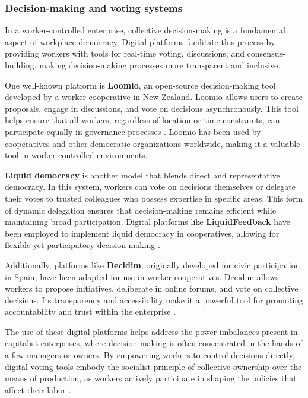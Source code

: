 \begin{refsection}
\subsubsection{Decision-making and voting systems}

In a worker-controlled enterprise, collective decision-making is a fundamental aspect of workplace democracy. Digital platforms facilitate this process by providing workers with tools for real-time voting, discussions, and consensus-building, making decision-making processes more transparent and inclusive.

One well-known platform is \textbf{Loomio}, an open-source decision-making tool developed by a worker cooperative in New Zealand. Loomio allows users to create proposals, engage in discussions, and vote on decisions asynchronously. This tool helps ensure that all workers, regardless of location or time constraints, can participate equally in governance processes \cite[pp.~54-57]{scholz2016}. Loomio has been used by cooperatives and other democratic organizations worldwide, making it a valuable tool in worker-controlled environments.

\textbf{Liquid democracy} is another model that blends direct and representative democracy. In this system, workers can vote on decisions themselves or delegate their votes to trusted colleagues who possess expertise in specific areas. This form of dynamic delegation ensures that decision-making remains efficient while maintaining broad participation. Digital platforms like \textbf{LiquidFeedback} have been employed to implement liquid democracy in cooperatives, allowing for flexible yet participatory decision-making \cite[pp.~109-113]{landemore2022}.

Additionally, platforms like \textbf{Decidim}, originally developed for civic participation in Spain, have been adapted for use in worker cooperatives. Decidim allows workers to propose initiatives, deliberate in online forums, and vote on collective decisions. Its transparency and accessibility make it a powerful tool for promoting accountability and trust within the enterprise \cite[pp.~45-49]{tormey2015}.

The use of these digital platforms helps address the power imbalances present in capitalist enterprises, where decision-making is often concentrated in the hands of a few managers or owners. By empowering workers to control decisions directly, digital voting tools embody the socialist principle of collective ownership over the means of production, as workers actively participate in shaping the policies that affect their labor \cite[pp.~67-70]{marx1988}.


\end{refsection}
